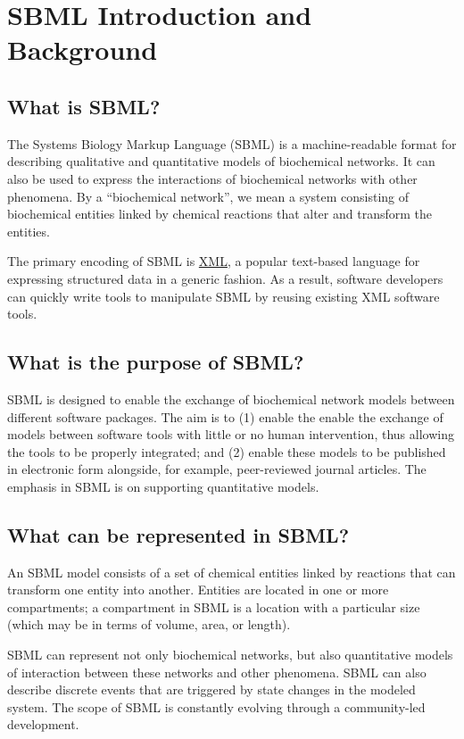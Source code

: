 \documentclass{sbmlfaq}
\begin{document}
\section{SBML Introduction and Background}
\label{sec:intro}

\subsection{What is SBML?}

The Systems Biology Markup Language (SBML) is a machine-readable format for
describing qualitative and quantitative models of biochemical networks.  It
can also be used to express the interactions of biochemical networks with
other phenomena.  By a ``biochemical network'', we mean a system consisting
of biochemical entities linked by chemical reactions that alter and
transform the entities.

The primary encoding of SBML is \href{http://www.w3.org/XML/}{XML}, a
popular text-based language for expressing structured data in a generic
fashion.  As a result, software developers can quickly write tools to
manipulate SBML by reusing existing XML software tools.


\subsection{What is the purpose of SBML?}

SBML is designed to enable the exchange of biochemical network models
between different software packages.  The aim is to (1) enable the enable
the exchange of models between software tools with little or no human
intervention, thus allowing the tools to be properly integrated; and (2)
enable these models to be published in electronic form alongside, for
example, peer-reviewed journal articles.  The emphasis in SBML is on
supporting quantitative models.


\subsection{What can be represented in SBML?}

An SBML model consists of a set of chemical entities linked by reactions
that can transform one entity into another.  Entities are located in one or
more compartments; a compartment in SBML is a location with a particular
size (which may be in terms of volume, area, or length).

SBML can represent not only biochemical networks, but also quantitative
models of interaction between these networks and other phenomena.  SBML can
also describe discrete events that are triggered by state changes in the
modeled system.  The scope of SBML is constantly evolving through a
community-led development.
\end{document}
